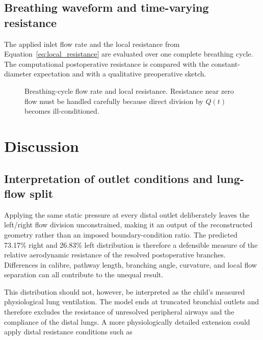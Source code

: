 \documentclass[11pt,a4paper]{article}
\begin{document}
\subsection{Breathing waveform and time-varying resistance}

The applied inlet flow rate and the local resistance from
Equation~\ref{eq:local_resistance} are evaluated over one complete breathing
cycle. The computational postoperative resistance is compared with the
constant-diameter expectation and with a qualitative preoperative sketch.

\begin{figure}[htbp]
  \centering
  \caption{Breathing-cycle flow rate and local resistance. Resistance near zero
  flow must be handled carefully because direct division by $Q(t)$ becomes
  ill-conditioned.}
  \label{fig:transient_resistance}
\end{figure}

\section{Discussion}
\label{sec:discussion}

\subsection{Interpretation of outlet conditions and lung-flow split}

Applying the same static pressure at every distal outlet deliberately leaves the
left/right flow division unconstrained, making it an output of the reconstructed
geometry rather than an imposed boundary-condition ratio. The predicted
73.17\% right and 26.83\% left distribution is therefore a defensible measure of
the relative aerodynamic resistance of the resolved postoperative branches.
Differences in calibre, pathway length, branching angle, curvature, and local
flow separation can all contribute to the unequal result.

This distribution should not, however, be interpreted as the child's measured
physiological lung ventilation. The model ends at truncated bronchial outlets and
therefore excludes the resistance of unresolved peripheral airways and the
compliance of the distal lungs. A more physiologically detailed extension could
apply distal resistance conditions such as
\end{document}
